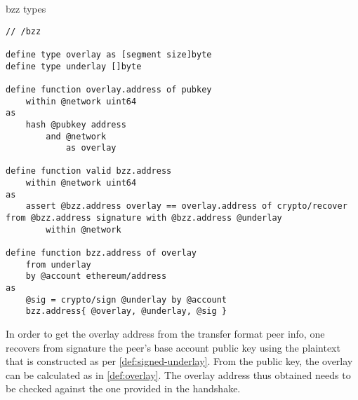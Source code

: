 \begin{definition}{bzz types}\label{def:bzz-types}
\begin{lstlisting}[language=buzz1]
// /bzz

define type overlay as [segment size]byte
define type underlay []byte

define function overlay.address of pubkey 
    within @network uint64 
as
    hash @pubkey address
        and @network 
            as overlay

define function valid bzz.address 
    within @network uint64
as
    assert @bzz.address overlay == overlay.address of crypto/recover from @bzz.address signature with @bzz.address @underlay
        within @network
        
define function bzz.address of overlay
    from underlay 
    by @account ethereum/address
as
    @sig = crypto/sign @underlay by @account
    bzz.address{ @overlay, @underlay, @sig }

\end{lstlisting}
\end{definition}




In order to get the overlay address from the transfer format peer info, one recovers from signature the peer's base account public key using the plaintext that is constructed as per \ref{def:signed-underlay}. From the public key, the overlay can be calculated as in \ref{def:overlay}. The overlay address thus obtained needs to be checked against the one provided in the handshake.

